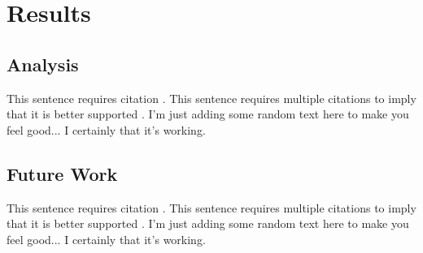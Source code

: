 %
%
\begingroup
\renewcommand{\cleardoublepage}{}
\renewcommand{\clearpage}{}
\chapter*{Results}\label{chap:Results}
\renewcommand{\chapter}[2]{}%



\section{Analysis}
\label{sec:Results_Analysis}

This sentence requires citation \cite{Devlin2019}. This sentence requires multiple citations to imply that it is better supported \citep{Kim2016,Rajpurkar2016}. I'm just adding some random text here to make you feel good... I certainly that it's working.

\section{Future Work}
\label{sec:Results_Future_Work}

This sentence requires citation \cite{Devlin2019}. This sentence requires multiple citations to imply that it is better supported \citep{Kim2016,Rajpurkar2016}. I'm just adding some random text here to make you feel good... I certainly that it's working.

\endgroup